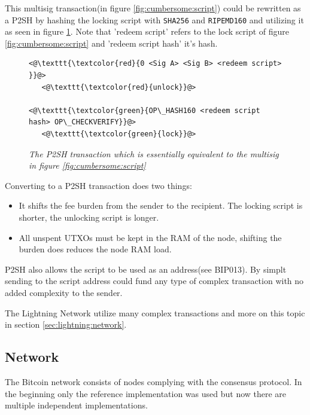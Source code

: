 This multisig transaction(in figure \ref{fig:cumbersome:script}) could be rewritten as a P2SH by hashing the locking script with \texttt{SHA256} and  \texttt{RIPEMD160} and utilizing it as seen in figure \ref{fig:p2sh}. Note that 'redeem script' refers to the lock script of figure \ref{fig:cumbersome:script} and 'redeem script hash' it's hash.

\begin{figure}[hbt!]
	
	\begin{lstlisting}
<@\texttt{\textcolor{red}{0 <Sig A> <Sig B> <redeem script> }}@>   
   <@\texttt{\textcolor{red}{unlock}}@>
	
<@\texttt{\textcolor{green}{OP\_HASH160 <redeem script hash> OP\_CHECKVERIFY}}@>
   <@\texttt{\textcolor{green}{lock}}@>
	\end{lstlisting}
	
	\caption{\textit{ The P2SH transaction which is essentially equivalent to the multisig in figure \ref{fig:cumbersome:script}
	}}
	\label{fig:p2sh}
\end{figure}

Converting to a P2SH transaction does two things:

\begin{itemize}

	\item It shifts the fee burden from the sender to the recipient. The locking script is shorter, the unlocking script is longer.
	
	\item All unspent UTXOs must be kept in the RAM of the node, shifting the burden does reduces the node RAM load. 
	
\end{itemize}

P2SH also allows the script to be used as an address(see BIP013\cite{bip:0013:p2shaddr}). By simplt sending to the script address could fund any type of complex transaction with no added complexity to the sender.

The Lightning Network utilize many complex transactions and more on this topic in section \ref{sec:lightning:network}.

\subsection{Network}

The Bitcoin network consists of nodes complying with the consensus protocol. In the beginning only the reference implementation was used but now there are multiple independent implementations\cite{repository:bitcoin}\cite{repository:btcd}\cite{repository:neutrino}.


